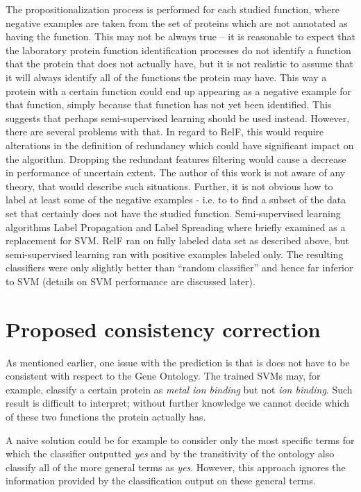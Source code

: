 \documentclass[11pt,twoside,a4paper]{book}
\begin{document}
The propositionalization process is performed for each studied function,
where negative examples are taken from the set of proteins which are not annotated
as having the function.
This may not be always true -- it is reasonable to expect that the laboratory protein
function identification processes do not identify a function that the protein that does not
actually have, but it is not realistic to assume that it will always identify all of the functions
the protein may have. 
This way a protein with a certain function could end up appearing as a negative example 
for that function, simply because that function has not yet been identified.
This suggests that perhaps semi-supervised learning should be used instead.
However, there are several problems with that.
In regard to RelF, this would require alterations in the definition of redundancy which 
could have significant impact on the algorithm.
Dropping the redundant features filtering would cause a decrease in performance
of uncertain extent. 
The author of this work is not aware of any theory, that would describe such situations.
Further, it is not obvious how to label at least some of the negative examples -
i.e. to to find a subset of the data set that certainly does not have the studied function.
Semi-supervised learning algorithms Label Propagation and Label Spreading \cite{semi}
where briefly examined as a replacement for SVM.
RelF ran on fully labeled data set as described above, but semi-supervised learning
ran with positive examples labeled only.
The resulting classifiers were only slightly better than ``random classifier''
and hence far inferior to SVM (details on SVM performance are discussed later).

\section{Proposed consistency correction}
As mentioned earlier, one issue with the prediction is that is does not have to be
consistent with respect to the Gene Ontology.
The trained SVMs may, for example, classify a certain protein
as \emph{metal ion binding}
but not \emph{ion binding}.
Such result is difficult to interpret;
without further knowledge we cannot decide
which of these two functions the protein actually has.

A naive solution could be for example
to consider only the most specific terms
for which the classifier outputted \emph{yes}
and by the transitivity of the ontology also
classify all of the more general terms as \emph{yes}.
However, this approach ignores the information
provided by the classification output on these
general terms. 
\end{document}
